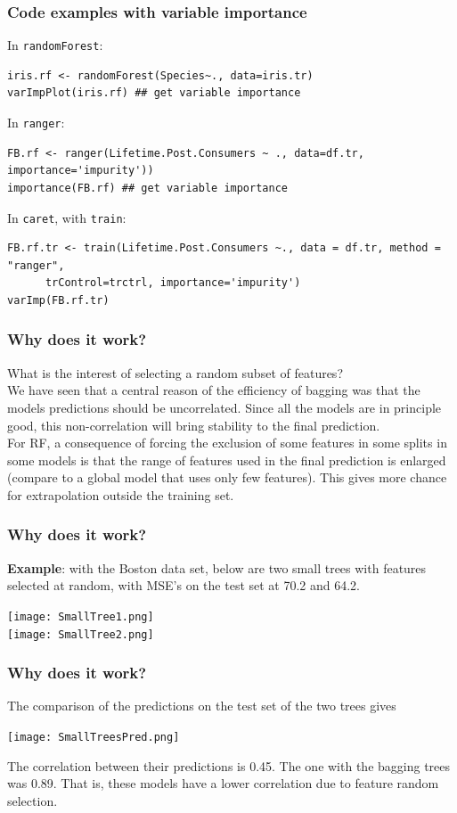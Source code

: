 \begin{frame}[fragile]
\frametitle{Code examples with variable importance}
\scriptsize
In {\tt randomForest}:
\begin{verbatim}
iris.rf <- randomForest(Species~., data=iris.tr) 
varImpPlot(iris.rf) ## get variable importance
\end{verbatim}
In {\tt ranger}:
\begin{verbatim}
FB.rf <- ranger(Lifetime.Post.Consumers ~ ., data=df.tr, importance='impurity'))
importance(FB.rf) ## get variable importance
\end{verbatim}
In {\tt caret}, with {\tt train}:
\begin{verbatim}
FB.rf.tr <- train(Lifetime.Post.Consumers ~., data = df.tr, method = "ranger",
      trControl=trctrl, importance='impurity')			
varImp(FB.rf.tr)
\end{verbatim}
\end{frame}
\begin{frame}
\frametitle{Why does it work?}
What is the interest of selecting a random subset of features?\\
\vspace{0.3cm}
We have seen that a central reason of the efficiency of bagging was that the models predictions should be uncorrelated. Since all the models are in principle good, this non-correlation will bring stability to the final prediction.\\
\vspace{0.3cm}
For RF, a consequence of forcing the exclusion of some features in some splits in some models is that the range of features used in the final prediction is enlarged (compare to a global model that uses only few features). This gives more chance for extrapolation outside the training set.
\end{frame}
\begin{frame}
\frametitle{Why does it work?}
{\bf Example}: with the Boston data set, below are two small trees with features selected at random, with MSE's on the test set at 70.2 and 64.2.
\vspace{-1cm}
\begin{center}
\texttt{[image: SmallTree1.png]}\\
\vspace{-3cm}
\texttt{[image: SmallTree2.png]}
\end{center}
\end{frame}
\begin{frame}
\frametitle{Why does it work?}
The comparison of the predictions on the test set of the two trees gives
\begin{center}
\texttt{[image: SmallTreesPred.png]}
\end{center}
The correlation between their predictions is 0.45. The one with the bagging trees was 0.89. That is, these models have a lower correlation due to feature random selection.
\end{frame}

